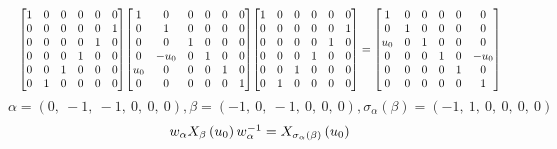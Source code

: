\documentclass[11pt]{article}
\theoremstyle{definition}
\begin{document}
\[
\scaletoalign{\textwidth}{{\left[\begin{matrix}1 & 0 & 0 & 0 & 0 & 0\\0 & 0 & 0 & 0 & 0 & 1\\0 & 0 & 0 & 0 & 1 & 0\\0 & 0 & 0 & 1 & 0 & 0\\0 & 0 & 1 & 0 & 0 & 0\\0 & 1 & 0 & 0 & 0 & 0\end{matrix}\right]} {\left[\begin{matrix}1 & 0 & 0 & 0 & 0 & 0\\0 & 1 & 0 & 0 & 0 & 0\\0 & 0 & 1 & 0 & 0 & 0\\0 & - u_{0} & 0 & 1 & 0 & 0\\u_{0} & 0 & 0 & 0 & 1 & 0\\0 & 0 & 0 & 0 & 0 & 1\end{matrix}\right]} {\left[\begin{matrix}1 & 0 & 0 & 0 & 0 & 0\\0 & 0 & 0 & 0 & 0 & 1\\0 & 0 & 0 & 0 & 1 & 0\\0 & 0 & 0 & 1 & 0 & 0\\0 & 0 & 1 & 0 & 0 & 0\\0 & 1 & 0 & 0 & 0 & 0\end{matrix}\right]} = {\left[\begin{matrix}1 & 0 & 0 & 0 & 0 & 0\\0 & 1 & 0 & 0 & 0 & 0\\u_{0} & 0 & 1 & 0 & 0 & 0\\0 & 0 & 0 & 1 & 0 & - u_{0}\\0 & 0 & 0 & 0 & 1 & 0\\0 & 0 & 0 & 0 & 0 & 1\end{matrix}\right]}}
\]
\[
\alpha = \left( 0, \  -1, \  -1, \  0, \  0, \  0\right), \beta = \left( -1, \  0, \  -1, \  0, \  0, \  0\right), \sigma_{\alpha}(\beta) = \left( -1, \  1, \  0, \  0, \  0, \  0\right)
\]
\[
\scaletoalign{\textwidth}{w_{\alpha} X_{\beta}\left(u_{0}\right) w_{\alpha}^{-1} = X_{\sigma_{\alpha}\left(\beta\right)}\left(u_{0}\right)}
\]
\end{document}
